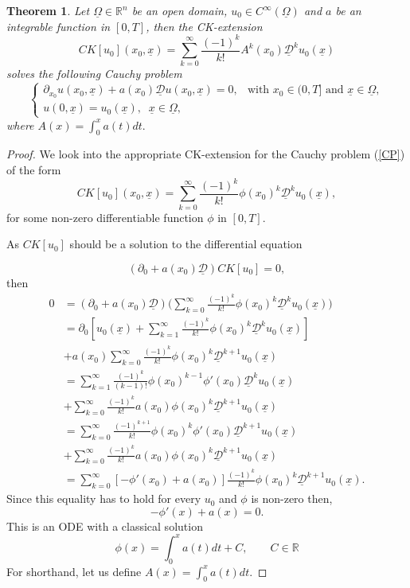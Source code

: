 \documentclass[12pt]{amsart}
\newcommand{\D}{\mathcal{D}}
\newtheorem{theorem}{Theorem}[section]
\theoremstyle{definition}
\newcommand{\R}{\mathbb{R}}
\newcommand{\un}{\underline}
\begin{document}
\begin{theorem}
    Let $\un{\Omega}\in \R^n$ be an open domain, $u_0 \in C^\infty(\un{\Omega})$ and $a$ be an integrable function in $[0,T]$, then the CK-extension
    \[
        CK[u_0](x_0, \un x) = \sum_{k = 0}^\infty \frac{(-1)^k}{k!}A^k(x_0)\un{\D}^ku_0(\un{x})
    \]
    solves the following Cauchy problem
    \[
    \begin{cases}
    \partial_{x_0} u(x_0,\un{x}) + a(x_0)\un{\D} u(x_0,\un{x}) = 0, & \text{with } x_0 \in (0, T] \text{ and } \un{x} \in \un{\Omega}, \\
    u(0,\un{x}) = u_0(\un{x}),\;\; \un{x}\in \un{\Omega},
    \end{cases}    \]
     where $A(x) = \int_0^x a(t) dt.$ 

    
\end{theorem}
\begin{proof}
We look into the %
appropriate CK-extension for the Cauchy problem (\ref{CP}) %
of the form
\[
CK[u_0](x_0, \un{x})=\sum_{k = 0}^\infty \frac{(-1)^k}{k!}\phi(x_0)^k\un{\D}^ku_0(\un{x}),
\]
for some non-zero differentiable function $\phi$ in $[0,T]$.

As $CK[u_0]$ should be a solution to the differential equation

\[
(\partial_0 + a(x_0)\un{\D})CK[u_0] =0,
\]
then
\begin{align*}
    0 
    &= (\partial_0 + a(x_0)\un{\D})\Big(\sum_{k = 0}^\infty \frac{(-1)^k}{k!}\phi(x_0)^k\un{\D}^ku_0(\un{x}) \Big) \\
   & = \partial_0[u_0(\un{x}) + \sum_{k = 1}^\infty \frac{(-1)^k}{k!}\phi(x_0)^k\un{\D}^ku_0(\un{x})]\\
    &+a(x_0)\sum_{k = 0}^\infty \frac{(-1)^k}{k!}\phi(x_0)^k\un{\D}^{k+1}u_0(\un{x}) \\
      & = \sum_{k = 1}^\infty \frac{(-1)^k}{(k-1)!}\phi(x_0)^{k-1}\phi'(x_0)\un{\D}^ku_0(\un{x}) \\
    &+\sum_{k = 0}^\infty \frac{(-1)^k}{k!}a(x_0)\phi(x_0)^k\un{\D}^{k+1}u_0(\un{x}) \\
    &= \sum_{k = 0}^\infty \frac{(-1)^{k+1}}{k!}\phi(x_0)^k\phi'(x_0)\un{\D}^{k+1}u_0(\un{x}) \\
    &+\sum_{k = 0}^\infty \frac{(-1)^k}{k!}a(x_0)\phi(x_0)^k\un{\D}^{k+1}u_0(\un{x}) \\
    &= \sum_{k = 0}^\infty [-\phi'(x_0) + a(x_0)]\frac{(-1)^k}{k!}\phi(x_0)^k\un{\D}^{k+1}u_0(\un{x}).
\end{align*}
Since this equality has to hold for every $u_0$ and $\phi$ is non-zero then,
\[  
-\phi'(x) + a(x) = 0. 
\]
This is an ODE with a classical solution
\[
\phi(x) = \int_0^x a(t) dt + C, \qquad C\in \mathbb{R}
\]
For shorthand, let us define $A(x) = \int_0^x a(t) dt$.


\end{proof}
\end{document}
